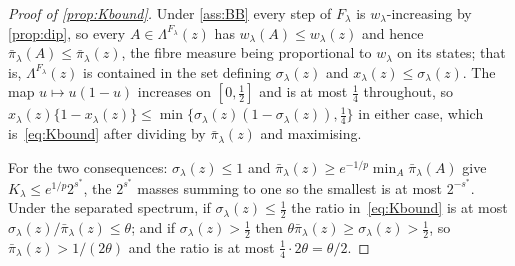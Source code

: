 \begin{proof}[Proof of \cref{prop:Kbound}]
    Under \cref{ass:BB} every step of $F_\lambda$ is $w_\lambda$-increasing
    by \cref{prop:dip}, so every $A\in\Lambda^{F_\lambda}(z)$ has
    $w_\lambda(A)\leq w_\lambda(z)$ and hence
    $\bar\pi_\lambda(A)\leq\bar\pi_\lambda(z)$, the fibre measure being
    proportional to $w_\lambda$ on its states; that is,
    $\Lambda^{F_\lambda}(z)$ is contained in the set defining
    $\sigma_\lambda(z)$ and $x_\lambda(z)\leq\sigma_\lambda(z)$. The map
    $u\mapsto u(1-u)$ increases on $[0,\tfrac12]$ and is at most $\tfrac14$
    throughout, so $x_\lambda(z)\{1-x_\lambda(z)\}\leq
    \min\{\sigma_\lambda(z)(1-\sigma_\lambda(z)),\tfrac14\}$ in either case,
    which is~\eqref{eq:Kbound} after dividing by
    $\bar\pi_\lambda(z)$ and maximising.

    For the two consequences: $\sigma_\lambda(z)\leq1$ and
    $\bar\pi_\lambda(z)\geq e^{-1/p}\min_A\bar\pi_\lambda(A)$ give
    $K_\lambda\leq e^{1/p}2^{s^{\ast}}$, the $2^{s^{\ast}}$ masses summing
    to one so the smallest is at most $2^{-s^{\ast}}$. Under the separated
    spectrum, if $\sigma_\lambda(z)\leq\tfrac12$ the ratio
    in~\eqref{eq:Kbound} is at most
    $\sigma_\lambda(z)/\bar\pi_\lambda(z)\leq\theta$; and if
    $\sigma_\lambda(z)>\tfrac12$ then
    $\theta\bar\pi_\lambda(z)\geq\sigma_\lambda(z)>\tfrac12$, so
    $\bar\pi_\lambda(z)>1/(2\theta)$ and the ratio is at most
    $\tfrac14\cdot2\theta=\theta/2$.
\end{proof}


